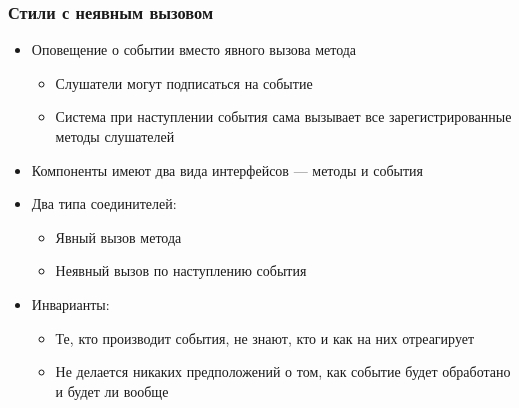 \documentclass[xetex,mathserif,serif]{beamer}
\begin{document}
    \begin{frame}
        \frametitle{Стили с неявным вызовом}
        \begin{itemize}
            \item Оповещение о событии вместо явного вызова метода
            \begin{itemize}
                \item Слушатели могут подписаться на событие
                \item Система при наступлении события сама вызывает все зарегистрированные методы слушателей
            \end{itemize}
            \item Компоненты имеют два вида интерфейсов --- методы и события
            \item Два типа соединителей:
            \begin{itemize}
                \item Явный вызов метода
                \item Неявный вызов по наступлению события
            \end{itemize}
            \item Инварианты:
            \begin{itemize}
                \item Те, кто производит события, не знают, кто и как на них отреагирует
                \item Не делается никаких предположений о том, как событие будет обработано и будет ли вообще
            \end{itemize}
        \end{itemize}
    \end{frame}
\end{document}
